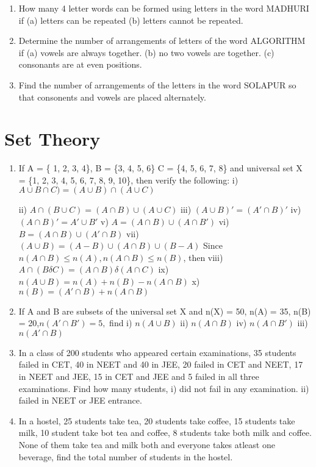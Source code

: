 \documentclass[14pt]{article}
\begin{document}
\begin{multicols}{2}
\begin{enumerate}
\item How many 4 letter words can be formed
using letters in the word MADHURI if
(a) letters can be repeated (b) letters cannot
be repeated.



\item Determine the number of arrangements of
letters of the word ALGORITHM if
(a) vowels are always together.
(b) no two vowels are together.
(c) consonants are at even positions.

\item Find the number of arrangements of the letters
in the word SOLAPUR so that consonents
and vowels are placed alternately.

\end{enumerate} 


\section{Set Theory}
\noindent
\begin{enumerate}
  
\item  If A = \{ 1, 2, 3, 4\}, B = \{3, 4, 5, 6\}
		  C = \{4, 5, 6, 7, 8\} and universal set  X = \{1, 2, 3, 4, 5, 6, 7, 8, 9, 10\}, then verify
the following:
i)		$ A \cup B\cap C) = (A\cup B) \cap (A \cup C)$

ii)	$A\cap (B\cup C)=(A\cap B)\cup (A \cup C)$
iii) $(A\cup B)' = (A'\cap B)'         $
iv)	$ (A\cap B)' = A'\cup B'          $
v)	$	 A = (A\cap B)\cup (A\cap B') $
vi)	$	 B = (A\cap B)\cup (A'\cap B) $
vii) $(A\cup B)=(A-B)\cup (A\cap B)\cup (B-A)$
Since $n(A \cap B)  \leq n(A),n(A\cap B)\leq n(B)$, then
viii)	$A \cap (B\delta C) = (A\cap B) \delta (A\cap C)$
ix) $n (A\cup B) = n(A) + n(B) - n(A\cap B)$
x) $n (B) = (A'\cap B) + n(A\cap B)$

\item If A and B are subsets of the universal set X and n(X) = 50, n(A) = 35, n(B) = 20,$ n(A'\cap B') = 5,$ find i) $n (A\cup B)$ ii) $n(A\cap B)$
iv) $ n(A\cap B')$
iii) $ n(A'\cap B) $

\item In a class of 200 students who appeared
certain examinations, 35 students failed
in CET, 40 in NEET and 40 in JEE,
20 failed in CET and NEET, 17 in NEET
and JEE, 15 in CET and JEE and 5 failed
in all three examinations. Find how many
students,
i)	did not fail in any examination.
ii) failed in NEET or JEE entrance.
		 
		 
\item In a hostel, 25 students take tea, 20 students
take coffee, 15 students take milk, 10
student take bot tea and coffee, 8 students
take both milk and coffee. None of them
take tea and milk both and everyone takes
atleast one beverage, find the total number
of students in the hostel.


\end{enumerate}
\end{multicols}
\end{document}
